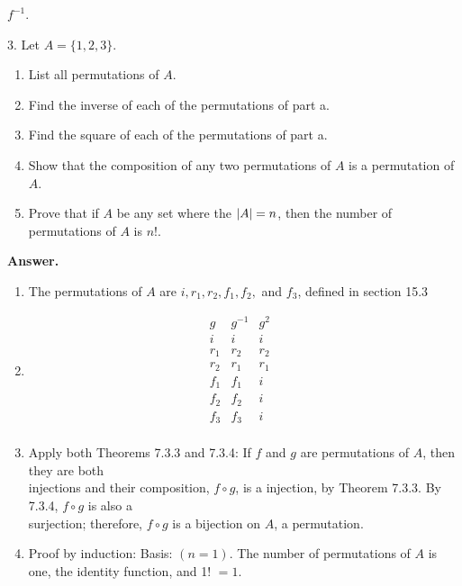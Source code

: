\documentclass[10pt,]{book}
\theoremstyle{plain}
\theoremstyle{definition}
\theoremstyle{definition}
\theoremstyle{definition}
\begin{document}
\begin{exercisegroup}
\(f^{-1}\).%
\par\smallskip
\item[3.]\hypertarget{exercise-25}{}Let \(A = \{1, 2, 3\}\).%
\par
\leavevmode%
\begin{enumerate}[label=\alph*]
\item\hypertarget{li-78}{} List all permutations of \(A\).%
\item\hypertarget{li-79}{} Find the inverse of each of the permutations of part a.%
\item\hypertarget{li-80}{} Find the square of each of the permutations of part a.%
\item\hypertarget{li-81}{} Show that the composition of any two permutations of \(A\) is a permutation of \( A\).%
\item\hypertarget{li-82}{} Prove that if \(A\) be any set where the \(|A|=\text{\textit{$n$}}\), then the number of permutations of \(A\) is \(n!\).%
\end{enumerate}
%
\par\smallskip
\par\smallskip
\noindent\textbf{Answer.}\hypertarget{answer-12}{}\quad
\leavevmode%
\begin{enumerate}[label=\alph*]
\item\hypertarget{li-83}{} The permutations of \(A\) are \(i,r_1,r_2,f_1,f_2,\) and \(f_3\), defined in section 15.3
%
\item\hypertarget{li-84}{}    
 \[\begin{array}{ccc}
g  & g^{-1} & g^2 \\
 i & i & i \\
r_1 & r_2 & r_2 & \\
r_2 & r_1 & r_1 & \\
f_1 & f_1 & i & \\
f_2 & f_2 & i & \\
f_3 & f_3 & i & \\
\end{array}\]%
\item\hypertarget{li-85}{} Apply both Theorems 7.3.3 and 7.3.4: If \(f\) and \(g\) are permutations of \(A\), then they are both  \\
 injections and their composition, \(f\circ g\), is a injection, by Theorem 7.3.3. By 7.3.4, \(f\circ g\) is also a \\
 surjection; therefore, \(f\circ g\) is a bijection on \(A\), a permutation.%
\item\hypertarget{li-86}{} Proof by induction: Basis: \((n=1)\).  The number of permutations of \(A\) is one, the identity function, and 1! \(=1\).%

\end{enumerate}
\end{exercisegroup}
\end{document}

